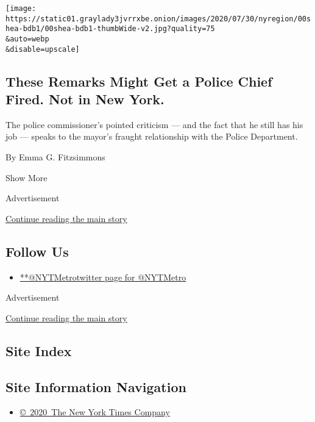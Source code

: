 \begin{enumerate}
  \texttt{[image: https://static01.graylady3jvrrxbe.onion/images/2020/07/30/nyregion/00shea-bdb1/00shea-bdb1-thumbWide-v2.jpg?quality=75\\\&auto=webp\\\&disable=upscale]}

  \hypertarget{these-remarks-might-get-a-police-chief-fired-not-in-new-york}{%
  \subsection{These Remarks Might Get a Police Chief Fired. Not in New
  York.}\label{these-remarks-might-get-a-police-chief-fired-not-in-new-york}}

  The police commissioner's pointed criticism --- and the fact that he
  still has his job --- speaks to the mayor's fraught relationship with
  the Police Department.

  By Emma G. Fitzsimmons
\end{enumerate}

Show More

Advertisement

\protect\hyperlink{after-mid2}{Continue reading the main story}

\hypertarget{follow-us}{%
\subsection{Follow Us}\label{follow-us}}

\begin{itemize}
\tightlist
\item
  \href{https://twitter.com/NYTMetro}{**@NYTMetrotwitter page for
  @NYTMetro}
\end{itemize}

Advertisement

\protect\hyperlink{after-mktg}{Continue reading the main story}

\hypertarget{site-index}{%
\subsection{Site Index}\label{site-index}}

\hypertarget{site-information-navigation}{%
\subsection{Site Information
Navigation}\label{site-information-navigation}}

\begin{itemize}
\tightlist
\item
  \href{https://help.nytimes3xbfgragh.onion/hc/en-us/articles/115014792127-Copyright-notice}{©~2020~The
  New York Times Company}
\end{itemize}


